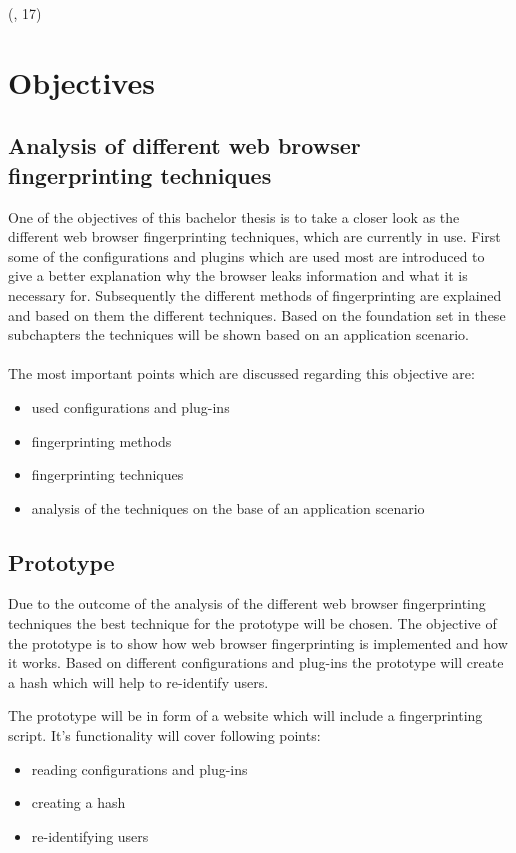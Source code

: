 (\textcite{Mayer09}, 17)

\newpage
\section{Objectives}
\subsection{Analysis of different web browser fingerprinting techniques}
One of the objectives of this bachelor thesis is to take a closer look as the different web browser fingerprinting techniques, which are currently in use. 
First some of the configurations and plugins which are used most are introduced to give a better explanation why the browser leaks information and what it is necessary for. Subsequently the different methods of fingerprinting are explained and based on them the different techniques.
Based on the foundation set in these subchapters the techniques will be shown based on an application scenario. \\ 
\\
The most important points which are discussed regarding this objective are:
\begin{itemize}
	\item used configurations and plug-ins
	\item fingerprinting methods
	\item fingerprinting techniques
	\item analysis of the techniques on the base of an application scenario
\end{itemize}

\subsection{Prototype}
Due to the outcome of the analysis of the different web browser fingerprinting techniques the best technique for the prototype will be chosen. The objective of the prototype is to show how web browser fingerprinting is implemented and how it works. Based on different configurations and plug-ins the prototype will create a hash which will help to re-identify users.

The prototype will be in form of a website which will include a fingerprinting script. It's functionality will cover following points:
\begin{itemize}
	\item reading configurations and plug-ins
	\item creating a hash
	\item re-identifying users
\end{itemize}

